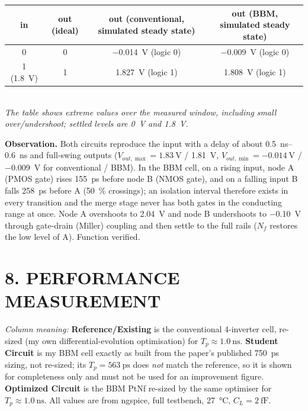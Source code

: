 \documentclass[11pt,a4paper]{article}
\newcommand{\sect}[1]{\section*{#1}}
\begin{document}
\begin{table}[H]
  \centering\small
  \begin{tabular}{@{}c c c c@{}}
    \toprule
    in & out (ideal) & out (conventional, simulated steady state) & out (BBM, simulated steady state)\\
    \midrule
    0 & 0 & \SI{-0.014}{\volt} (logic 0) & \SI{-0.009}{\volt} (logic 0)\\
    1 (\SI{1.8}{\volt}) & 1 & \SI{1.827}{\volt} (logic 1) & \SI{1.808}{\volt} (logic 1)\\
    \bottomrule
  \end{tabular}\\[3pt]
  {\footnotesize\emph{The table shows extreme values over the measured window, including small over/undershoot; settled levels are \SI{0}{\volt} and \SI{1.8}{\volt}.}}
\end{table}

\textbf{Observation.} Both circuits reproduce the input with a delay of about \SIrange{0.5}{0.6}{\nano\second} and full-swing outputs ($V_{out,\max}=\SI{1.83}{\volt}$ / \SI{1.81}{\volt}, $V_{out,\min}=\SI{-0.014}{\volt}$ / \SI{-0.009}{\volt} for conventional / BBM). In the BBM cell, on a rising input, node A (PMOS gate) rises \SI{155}{\pico\second} before node B (NMOS gate), and on a falling input B falls \SI{258}{\pico\second} before A (\SI{50}{\percent} crossings); an isolation interval therefore exists in every transition and the merge stage never has both gates in the conducting range at once. Node A overshoots to \SI{2.04}{\volt} and node B undershoots to \SI{-0.10}{\volt} through gate-drain (Miller) coupling and then settle to the full rails ($N_f$ restores the low level of A). Function verified.

\sect{8. PERFORMANCE MEASUREMENT}
\emph{Column meaning:} \textbf{Reference/Existing} is the conventional 4-inverter cell, re-sized (my own differential-evolution optimisation) for $T_p\approx\SI{1.0}{\nano\second}$. \textbf{Student Circuit} is my BBM cell exactly as built from the paper's published \SI{750}{\pico\second} sizing, not re-sized; its $T_p=\SI{563}{\pico\second}$ does \emph{not} match the reference, so it is shown for completeness only and must not be used for an improvement figure. \textbf{Optimized Circuit} is the BBM PtNf re-sized by the same optimiser for $T_p\approx\SI{1.0}{\nano\second}$. All values are from ngspice, full testbench, \SI{27}{\celsius}, $C_L=\SI{2}{\femto\farad}$.
\end{document}
